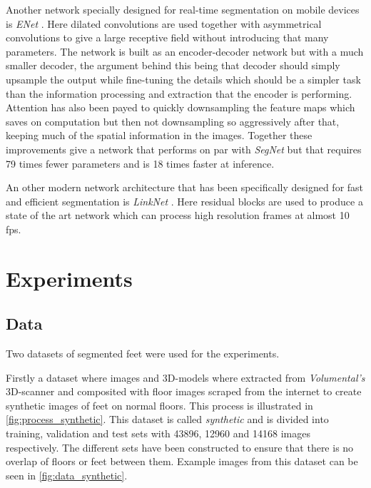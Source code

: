 \documentclass{kththesis}
\newcommand{\bibentry}[1]{\parencite{#1}}
\begin{document}
Another network specially designed for real-time segmentation on mobile devices
is \emph{ENet} \bibentry{paszke2016enet}. Here dilated convolutions are used
together with asymmetrical convolutions to give a large receptive field without
introducing that many parameters. The network is built as an encoder-decoder
network but with a much smaller decoder, the argument behind this being that
decoder should simply upsample the output while fine-tuning the details which
should be a simpler task than the information processing and extraction that the
encoder is performing. Attention has also been payed to quickly downsampling the
feature maps which saves on computation but then not downsampling so
aggressively after that, keeping much of the spatial information in the images.
Together these improvements give a network that performs on par with
\emph{SegNet} but that requires 79 times fewer parameters and is 18 times faster
at inference. 

An other modern network architecture that has been specifically designed for fast and
efficient segmentation is \textit{LinkNet}
\parencite{chaurasia2017linknet}. Here residual blocks \parencite{residual} are used to produce a
state of the art network which can process high resolution frames at almost 10
fps.


\chapter{Experiments}
\section{Data}
Two datasets of segmented feet were used for the experiments.

Firstly a dataset where images and 3D-models where extracted from
\textit{Volumental's}
3D-scanner and composited with floor images scraped from the internet to create
synthetic images of feet on normal floors. This process is illustrated in \cref{fig:process_synthetic}.
This dataset is called
\textit{synthetic} and is divided into training, validation and test sets with
43896, 12960 and 14168 images respectively. The different sets have been
constructed to ensure that there is no overlap of floors or feet between them.
Example images from this dataset can be seen in \cref{fig:data_synthetic}.
\end{document}
